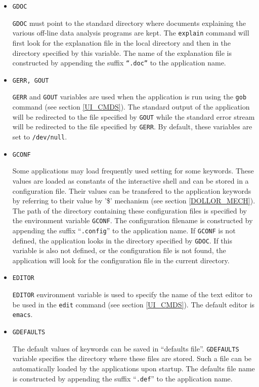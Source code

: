 \documentclass[11pt]{article}
\begin{document}
\begin{itemize}

\item        {\tt GDOC}
  
  {\tt GDOC} must point to the standard directory where documents
  explaining the various off-line data analysis programs are kept.
  The {\tt explain} command will first look for the explanation file
  in the local directory and then in the directory specified by this
  variable.  The name of the explanation file is constructed by
  appending the suffix {\tt ``.doc''} to the application name.

\item        {\tt GERR, GOUT}
  
  {\tt GERR} and {\tt GOUT} variables are used when the application is
  run using the {\tt gob} command (see section \ref{UI_CMDS}).  The
  standard output of the application will be redirected to the file
  specified by {\tt GOUT} while the standard error stream will be
  redirected to the file specified by {\tt GERR}.  By default, these
  variables are set to {\tt /dev/null}.

\item   {\tt GCONF}
  
  Some applications may load frequently used setting for some
  keywords.  These values are loaded as constants of the interactive
  shell and can be stored in a configuration file.  Their values can
  be transfered to the application keywords by referring to their
  value by '\$' mechanism (see section \ref{DOLLOR_MECH}).  The path
  of the directory containing these configuration files is specified
  by the environment variable {\tt GCONF}.  The configuration filename
  is constructed by appending the suffix ``{\tt .config}'' to the
  application name.  If {\tt GCONF} is not defined, the application
  looks in the directory specified by {\tt GDOC}.  If this variable is
  also not defined, or the configuration file is not found, the
  application will look for the configuration file in the current
  directory.

\item   {\tt EDITOR}
  
  {\tt EDITOR} environment variable is used to specify the name of the
  text editor to be used in the {\tt edit} command (see section
  \ref{UI_CMDS}).  The default editor is {\tt emacs}.

\item   {\tt GDEFAULTS}
  
  The default values of keywords can be saved in ``defaults file''.
  {\tt GDEFAULTS} variable specifies the directory where these files
  are stored.  Such a file can be automatically loaded by the
  applications upon startup.  The defaults file name is constructed by
  appending the suffix ``{\tt.def}'' to the application name.
  

\end{itemize}
\end{document}
